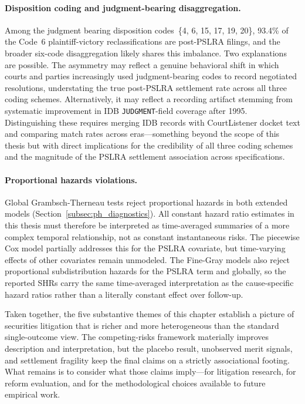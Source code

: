 \paragraph{Disposition coding and judgment-bearing disaggregation.}
Among the judgment bearing disposition codes~\{4, 6, 15, 17,
19, 20\}, 93.4\% of the Code~6 plaintiff-victory
reclassifications are post-PSLRA filings, and the broader
six-code disaggregation likely shares this imbalance. Two
explanations are possible. The asymmetry may reflect a genuine
behavioral shift in which courts and parties increasingly used
judgment-bearing codes to record negotiated resolutions,
understating the true post-PSLRA settlement rate across all
three coding schemes. Alternatively, it may reflect a recording artifact stemming
from systematic improvement in IDB \texttt{JUDGMENT}-field
coverage after 1995. Distinguishing these
requires merging IDB records with CourtListener docket text
and comparing match rates across eras---something beyond
the scope of this thesis but with direct implications for the
credibility of all three coding schemes and the magnitude of
the PSLRA settlement association across specifications.

\paragraph{Proportional hazards violations.}
Global Grambsch-Therneau tests reject proportional hazards
in both extended models
(Section~\ref{subsec:ph_diagnostics}). All constant hazard
ratio estimates in this thesis must therefore be interpreted
as time-averaged summaries of a more complex temporal
relationship, not as constant instantaneous risks. The
piecewise Cox model partially addresses this for the PSLRA
covariate, but time-varying effects of other covariates remain
unmodeled. The Fine-Gray models also reject proportional
subdistribution hazards for the PSLRA term and globally, so
the reported SHRs carry the same time-averaged interpretation
as the cause-specific hazard ratios rather than a literally
constant effect over follow-up.

Taken together, the five substantive themes of this chapter
establish a picture of securities litigation that is richer
and more heterogeneous than the standard single-outcome view.
The competing-risks framework materially improves description
and interpretation, but the placebo result, unobserved merit
signals, and settlement fragility keep the final claims on a
strictly associational footing. What remains is to consider
what those claims imply---for litigation research, for
reform evaluation, and for the methodological choices
available to future empirical work.
